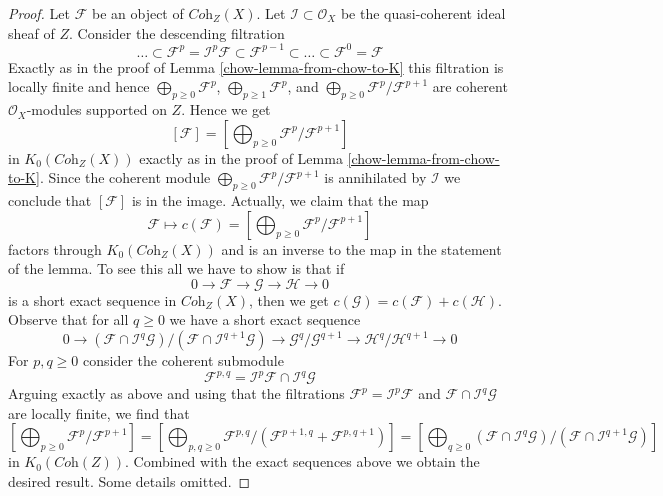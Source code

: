 \begin{proof}

Let $\mathcal{F}$ be an object of $\textit{Coh}_Z(X)$.
Let $\mathcal{I} \subset \mathcal{O}_X$ be the quasi-coherent
ideal sheaf of $Z$. Consider the descending filtration
$$
\ldots \subset
\mathcal{F}^p = \mathcal{I}^p \mathcal{F} \subset
\mathcal{F}^{p - 1} \subset \ldots \subset \mathcal{F}^0 = \mathcal{F}
$$
Exactly as in the proof of Lemma \ref{chow-lemma-from-chow-to-K} this filtration
is locally finite and hence
$\bigoplus_{p \geq 0} \mathcal{F}^p$,
$\bigoplus_{p \geq 1} \mathcal{F}^p$, and
$\bigoplus_{p \geq 0} \mathcal{F}^p/\mathcal{F}^{p + 1}$
are coherent $\mathcal{O}_X$-modules supported on $Z$.
Hence we get
$$
[\mathcal{F}] =
[\bigoplus\nolimits_{p \geq 0} \mathcal{F}^p/\mathcal{F}^{p + 1}]
$$
in $K_0(\textit{Coh}_Z(X))$ exactly as in the proof of
Lemma \ref{chow-lemma-from-chow-to-K}. Since the coherent module
$\bigoplus_{p \geq 0} \mathcal{F}^p/\mathcal{F}^{p + 1}$
is annihilated by $\mathcal{I}$ we conclude that
$[\mathcal{F}]$ is in the image. Actually, we claim that the map
$$
\mathcal{F} \longmapsto
c(\mathcal{F}) =
[\bigoplus\nolimits_{p \geq 0} \mathcal{F}^p/\mathcal{F}^{p + 1}]
$$
factors through $K_0(\textit{Coh}_Z(X))$ and is an inverse to
the map in the statement of the lemma. To see this all we have
to show is that if
$$
0 \to \mathcal{F} \to \mathcal{G} \to \mathcal{H} \to 0
$$
is a short exact sequence in $\textit{Coh}_Z(X)$, then we
get $c(\mathcal{G}) = c(\mathcal{F}) + c(\mathcal{H})$.
Observe that for all $q \geq 0$ we have a short exact sequence
$$
0 \to
(\mathcal{F} \cap \mathcal{I}^q\mathcal{G})/
(\mathcal{F} \cap \mathcal{I}^{q + 1}\mathcal{G}) \to
\mathcal{G}^q/\mathcal{G}^{q + 1} \to
\mathcal{H}^q/\mathcal{H}^{q + 1} \to 0
$$
For $p, q \geq 0$ consider the coherent submodule
$$
\mathcal{F}^{p, q} = \mathcal{I}^p\mathcal{F} \cap \mathcal{I}^q\mathcal{G}
$$
Arguing exactly as above and using that the filtrations
$\mathcal{F}^p = \mathcal{I}^p\mathcal{F}$ and
$\mathcal{F} \cap \mathcal{I}^q\mathcal{G}$ are locally finite,
we find that
$$
[\bigoplus\nolimits_{p \geq 0} \mathcal{F}^p/\mathcal{F}^{p + 1}] =
[\bigoplus\nolimits_{p, q \geq 0}
\mathcal{F}^{p, q}/(\mathcal{F}^{p + 1, q} + \mathcal{F}^{p, q + 1})] =
[\bigoplus\nolimits_{q \geq 0}
(\mathcal{F} \cap \mathcal{I}^q\mathcal{G})/
(\mathcal{F} \cap \mathcal{I}^{q + 1}\mathcal{G})]
$$
in $K_0(\textit{Coh}(Z))$. Combined with the exact sequences above we obtain
the desired result. Some details omitted.
\end{proof}

